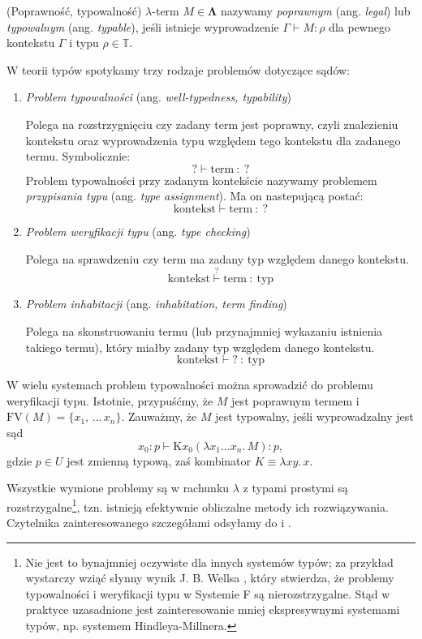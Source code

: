 \begin{definicja}(Poprawność, typowalność)
  \(\lambda\)-term \(M\in\mathbf{\Lambda}\) nazywamy \emph{poprawnym} (ang. \emph{legal}) lub \emph{typowalnym} (ang. \emph{typable}), jeśli istnieje wyprowadzenie \(\Gamma\vdash M:\rho\) dla pewnego kontekstu \(\Gamma\) i typu \(\rho\in\mathbb{T}\). 
\end{definicja}

W teorii typów spotykamy trzy rodzaje problemów dotyczące sądów:
\begin{enumerate}
  \setlength\itemsep{0em}
  \item \emph{Problem typowalności} (ang. \emph{well-typedness, typability})

    Polega na rozstrzygnięciu czy zadany term jest poprawny, czyli znalezieniu kontekstu oraz wyprowadzenia typu względem tego kontekstu dla zadanego termu. Symbolicznie:
    \[ \mathbf{?} \vdash \text{term}\ :\ \mathbf{?} \]
    Problem typowalności przy zadanym kontekście nazywamy problemem \emph{przypisania typu} (ang. \emph{type assignment}). Ma on nastepującą postać: 
    \[ \text{kontekst} \vdash \text{term}\ :\ \mathbf{?} \]
  \item \emph{Problem weryfikacji typu} (ang. \emph{type checking}) 
    
    Polega na sprawdzeniu czy term ma zadany typ względem danego kontekstu.
    \[ \text{kontekst} \stackrel{\mathbf{?}}{\vdash} \text{term}\ :\ \text{typ} \]
  \item \emph{Problem inhabitacji} (ang. \emph{inhabitation, term finding})

    Polega na skonstruowaniu termu (lub przynajmniej wykazaniu istnienia takiego termu), który    miałby zadany typ względem danego kontekstu. 
    \[
      \text{kontekst} \vdash \mathbf{?}\ :\ \text{typ}
    \]
\end{enumerate}

W wielu systemach problem typowalności można sprowadzić do problemu weryfikacji typu. Istotnie, przypuśćmy, że \(M\) jest poprawnym termem i \(\mathrm{FV}(M)=\{x_1,\,\dots\,x_n\}\). Zauważmy, że \(M\) jest typowalny, jeśli wyprowadzalny jest sąd
\[
  x_0:p\vdash \mathrm{K} x_0 (\lambda x_1 \dots x_n.\,M):p,
\]
gdzie \(p\in U\) jest zmienną typową, zaś kombinator \(K\equiv \lambda xy.\,x\).

Wszystkie wymione problemy są w rachunku \(\lambda\) z typami prostymi są rozstrzygalne\footnote{Nie jest to bynajmniej oczywiste dla innych systemów typów; za przykład wystarczy wziąć słynny wynik J. B. Wellsa \cite{Wells_98}, który stwierdza, że  problemy typowalności i weryfikacji typu w Systemie F są nierozstrzygalne. Stąd w praktyce uzasadnione jest zainteresowanie mniej ekspresywnymi systemami typów, np. systemem Hindleya-Millnera.}, tzn. istnieją efektywnie obliczalne metody ich rozwiązywania. Czytelnika zainteresowanego szczegółami odsyłamy do \cite[Twierdzenie 3.2.7]{Urzyczyn2006} i \cite[Rozdział 4.4]{Barendregt_1992}.

